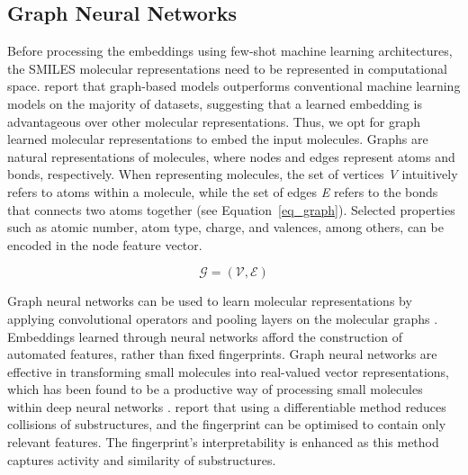 \subsection{Graph Neural Networks}

Before processing the embeddings using few-shot machine learning architectures, the SMILES molecular representations need to be represented in computational space. \citet{wu2018moleculenet} report that graph-based models outperforms conventional machine learning models on the majority of datasets, suggesting that a learned embedding is advantageous over other molecular representations. Thus, we opt for graph learned molecular representations to embed the input molecules. Graphs are natural representations of molecules, where nodes and edges represent atoms and bonds, respectively. When representing molecules, the set of vertices \textit{V} intuitively refers to atoms within a molecule, while the set of edges \textit{E} refers to the bonds that connects two atoms together (see Equation~\ref{eq_graph}). Selected properties such as atomic number, atom type, charge, and valences, among others, can be encoded in the node feature vector.

\begin{equation}\label{eq_graph}
	\mathcal{G}=(\mathcal{V}, \mathcal{E})
\end{equation}

Graph neural networks can be used to learn molecular representations by applying convolutional operators and pooling layers on the molecular graphs \cite{jiang2021could}. Embeddings learned through neural networks afford the construction of automated features, rather than fixed fingerprints. Graph neural networks are effective in transforming small molecules into real-valued vector representations, which has been found to be a productive way of processing small molecules within deep neural networks \cite{gomez2018automatic}. \citet{duvenaud2015convolutional} report that using a differentiable method reduces collisions of substructures, and the fingerprint can be optimised to contain only relevant features. The fingerprint's interpretability is enhanced as this method captures activity and similarity of substructures.

